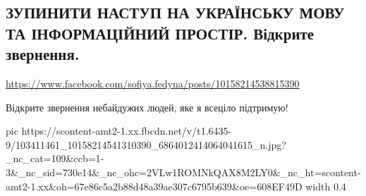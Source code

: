  
 
 
 
 

\subsection{ЗУПИНИТИ НАСТУП НА УКРАЇНСЬКУ МОВУ ТА ІНФОРМАЦІЙНИЙ ПРОСТІР. Відкрите звернення.}
\label{sec:15_06_2020.fb.fedina_sofia.1.mova_protest}
\url{https://www.facebook.com/sofiya.fedyna/posts/10158214538815390}

Відкрите звернення небайдужих людей, яке я всеціло підтримую!


\ifcmt
  pic https://scontent-amt2-1.xx.fbcdn.net/v/t1.6435-9/103411461_10158214541310390_6864012414064041615_n.jpg?_nc_cat=109&ccb=1-3&_nc_sid=730e14&_nc_ohc=2VLw1ROMNkQAX8M2LY0&_nc_ht=scontent-amt2-1.xx&oh=67e86c5a2b88d48a39ae307c6795b639&oe=608EF49D
  width 0.4
\fi

